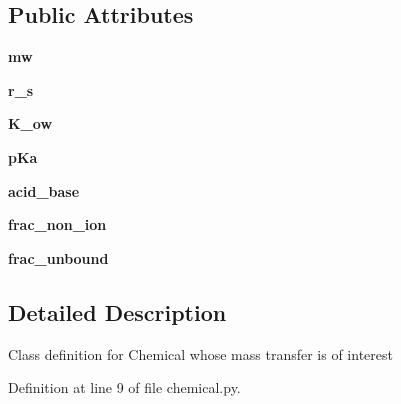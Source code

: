 \subsection*{Public Attributes}
\begin{DoxyCompactItemize}
\item 
{\bfseries mw}\hypertarget{classchemical_1_1Chemical_a71ef6f9ef7c34b7d5e277f6d65abaf84}{}\label{classchemical_1_1Chemical_a71ef6f9ef7c34b7d5e277f6d65abaf84}

\item 
{\bfseries r\+\_\+s}\hypertarget{classchemical_1_1Chemical_ad88241754d8905cb6ad5f92559cca73c}{}\label{classchemical_1_1Chemical_ad88241754d8905cb6ad5f92559cca73c}

\item 
{\bfseries K\+\_\+ow}\hypertarget{classchemical_1_1Chemical_a6d49dd119167d150d31462c9ed25bd34}{}\label{classchemical_1_1Chemical_a6d49dd119167d150d31462c9ed25bd34}

\item 
{\bfseries p\+Ka}\hypertarget{classchemical_1_1Chemical_a691d7f84f5ede16356517613adddb3d6}{}\label{classchemical_1_1Chemical_a691d7f84f5ede16356517613adddb3d6}

\item 
{\bfseries acid\+\_\+base}\hypertarget{classchemical_1_1Chemical_a0529584b85dd64b2eeb6bd9744356391}{}\label{classchemical_1_1Chemical_a0529584b85dd64b2eeb6bd9744356391}

\item 
{\bfseries frac\+\_\+non\+\_\+ion}\hypertarget{classchemical_1_1Chemical_a93543fa4cdf7d328201647ae4886ceda}{}\label{classchemical_1_1Chemical_a93543fa4cdf7d328201647ae4886ceda}

\item 
{\bfseries frac\+\_\+unbound}\hypertarget{classchemical_1_1Chemical_a6d8076f1203590f6591b98edd701898f}{}\label{classchemical_1_1Chemical_a6d8076f1203590f6591b98edd701898f}

\end{DoxyCompactItemize}


\subsection{Detailed Description}
\begin{DoxyVerb}Class definition for Chemical whose mass transfer is of interest
\end{DoxyVerb}
 

Definition at line 9 of file chemical.\+py.



